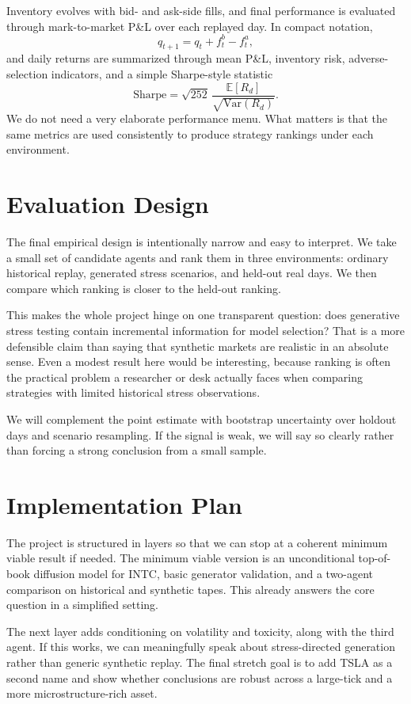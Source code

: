 \documentclass[10pt,letterpaper,twocolumn]{article}
\newcommand{\E}{\mathbb{E}}
\newcommand{\Var}{\mathrm{Var}}
\newcommand{\Sharpe}{\mathrm{Sharpe}}
\begin{document}
Inventory evolves with bid- and ask-side fills, and final performance is evaluated through mark-to-market P\&L over each replayed day. In compact notation,
\[
q_{t+1}=q_t+f_t^b-f_t^a,
\]
and daily returns are summarized through mean P\&L, inventory risk, adverse-selection indicators, and a simple Sharpe-style statistic
\[
\Sharpe = \sqrt{252}\,\frac{\E[R_d]}{\sqrt{\Var(R_d)}}.
\]
We do not need a very elaborate performance menu. What matters is that the same metrics are used consistently to produce strategy rankings under each environment.

\section{Evaluation Design}

The final empirical design is intentionally narrow and easy to interpret. We take a small set of candidate agents and rank them in three environments: ordinary historical replay, generated stress scenarios, and held-out real days. We then compare which ranking is closer to the held-out ranking.

This makes the whole project hinge on one transparent question: does generative stress testing contain incremental information for model selection? That is a more defensible claim than saying that synthetic markets are realistic in an absolute sense. Even a modest result here would be interesting, because ranking is often the practical problem a researcher or desk actually faces when comparing strategies with limited historical stress observations.

We will complement the point estimate with bootstrap uncertainty over holdout days and scenario resampling. If the signal is weak, we will say so clearly rather than forcing a strong conclusion from a small sample.

\section{Implementation Plan}

The project is structured in layers so that we can stop at a coherent minimum viable result if needed. The minimum viable version is an unconditional top-of-book diffusion model for INTC, basic generator validation, and a two-agent comparison on historical and synthetic tapes. This already answers the core question in a simplified setting.

The next layer adds conditioning on volatility and toxicity, along with the third agent. If this works, we can meaningfully speak about stress-directed generation rather than generic synthetic replay. The final stretch goal is to add TSLA as a second name and show whether conclusions are robust across a large-tick and a more microstructure-rich asset.
\end{document}
